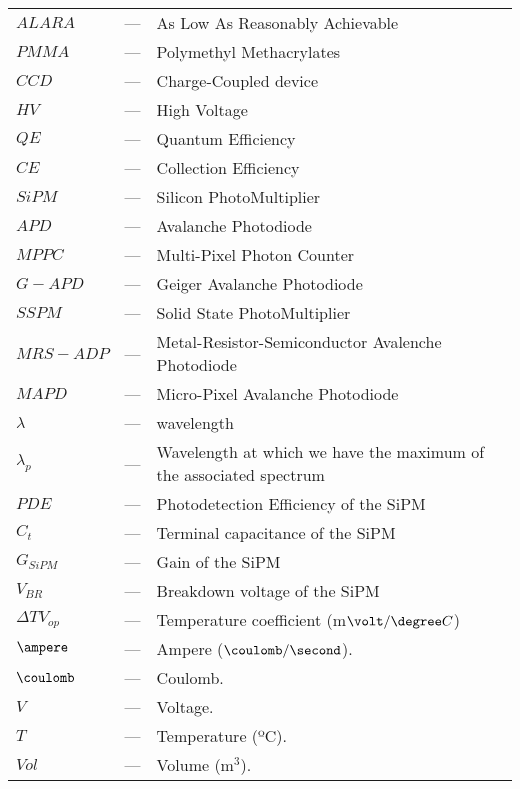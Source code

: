\begin{longtable}{p{25mm} c p{120mm} }
$ALARA$ & --- & As Low As Reasonably Achievable\\
$PMMA$ & --- & Polymethyl Methacrylates\\
$CCD$ & --- & Charge-Coupled device\\
$HV$ & --- & High Voltage\\
$QE$ & --- & Quantum Efficiency\\
$CE$ & --- & Collection Efficiency\\
$SiPM$ & --- & Silicon PhotoMultiplier\\
$APD$ & --- & Avalanche Photodiode\\
$MPPC$ & --- & Multi-Pixel Photon Counter\\
$G-APD$ & --- & Geiger Avalanche Photodiode\\
$SSPM$ & --- & Solid State PhotoMultiplier\\
$MRS-ADP$ & --- & Metal-Resistor-Semiconductor Avalenche Photodiode\\
$MAPD$ & --- & Micro-Pixel Avalanche Photodiode\\
$\lambda$ & --- & wavelength\\
$\lambda_p$ & --- & Wavelength at which we have the maximum of the
\newline associated spectrum\\
$PDE$ & --- & Photodetection Efficiency of the SiPM\\
$C_t$ & --- & Terminal capacitance of the SiPM\\
$G_{SiPM}$ & --- & Gain of the SiPM\\
$V_{BR}$ & --- & Breakdown voltage of the SiPM\\
$\Delta TV_{op}$ & --- & Temperature coefficient (m$\volt/\degree C$)\\
$\ampere$ & --- & Ampere ($\coulomb/\second$).\\
$\coulomb$ & --- & Coulomb.\\


$V$ & --- & Voltage.\\
$T$ & --- & Temperature (ºC).\\
$Vol$ & --- & Volume (m$^3$).\\



\end{longtable}
